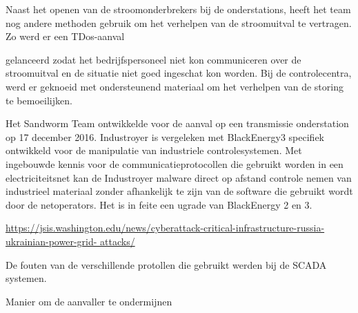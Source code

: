 		Naast het openen van de stroomonderbrekers bij de onderstations, heeft het team nog andere
		methoden gebruik om het verhelpen van de stroomuitval te vertragen. Zo werd er een TDos-aanval
		
		gelanceerd zodat het bedrijfspersoneel niet kon communiceren over de stroomuitval en de situatie
		niet goed ingeschat kon worden. Bij de controlecentra, werd er geknoeid met ondersteunend
		materiaal om het verhelpen van de storing te bemoeilijken.
		
		Het Sandworm Team ontwikkelde voor de aanval op een transmissie onderstation op 17 december
		2016. Industroyer is vergeleken met BlackEnergy3 specifiek ontwikkeld voor de manipulatie van
		industriele controlesystemen. Met ingebouwde kennis voor de communicatieprotocollen die
		gebruikt worden in een electriciteitsnet kan de Industroyer malware direct op afstand controle
		nemen van industrieel materiaal zonder afhankelijk te zijn van de software die gebruikt wordt door
		de netoperators. Het is in feite een ugrade van BlackEnergy 2 en 3.
		
		\url{https://jsis.washington.edu/news/cyberattack-critical-infrastructure-russia-ukrainian-power-grid-
			attacks/}
		
		De fouten van de verschillende protollen die gebruikt werden bij de SCADA
		systemen.
		
		
		
		Manier om de aanvaller te ondermijnen
		
